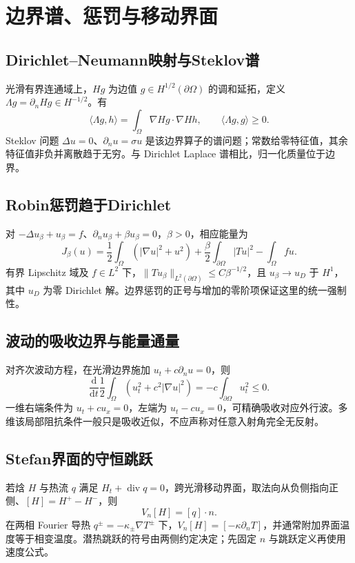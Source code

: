 \documentclass[../main.tex]{subfiles}
\begin{document}
\section{边界谱、惩罚与移动界面}
\subsection{Dirichlet--Neumann映射与Steklov谱}
光滑有界连通域上，$Hg$ 为边值 $g\in H^{1/2}(\partial\Omega)$ 的调和延拓，定义 $\Lambda g=\partial_nHg\in H^{-1/2}$。有
\[
\langle\Lambda g,h\rangle=\int_\Omega\nabla Hg\cdot\nabla Hh,\qquad
\langle\Lambda g,g\rangle\ge0.
\]
Steklov 问题 $\Delta u=0$、$\partial_nu=\sigma u$ 是该边界算子的谱问题；常数给零特征值，其余特征值非负并离散趋于无穷。与 Dirichlet Laplace 谱相比，归一化质量位于边界。
\subsection{Robin惩罚趋于Dirichlet}
对 $-\Delta u_\beta+u_\beta=f$、$\partial_nu_\beta+\beta u_\beta=0$，$\beta>0$，相应能量为
\[
J_\beta(u)=\frac12\int_\Omega(|\nabla u|^2+u^2)
+\frac\beta2\int_{\partial\Omega}|Tu|^2-\int_\Omega fu.
\]
有界 Lipschitz 域及 $f\in L^2$ 下，$\|Tu_\beta\|_{L^2(\partial\Omega)}\le C\beta^{-1/2}$，且 $u_\beta\to u_D$ 于 $H^1$，其中 $u_D$ 为零 Dirichlet 解。边界惩罚的正号与增加的零阶项保证这里的统一强制性。
\subsection{波动的吸收边界与能量通量}
对齐次波动方程，在光滑边界施加 $u_t+c\partial_nu=0$，则
\[
\frac{\mathrm d}{\mathrm dt}\frac12\int_\Omega(u_t^2+c^2|\nabla u|^2)
=-c\int_{\partial\Omega}u_t^2\le0.
\]
一维右端条件为 $u_t+cu_x=0$，左端为 $u_t-cu_x=0$，可精确吸收对应外行波。多维该局部阻抗条件一般只是吸收近似，不应声称对任意入射角完全无反射。
\subsection{Stefan界面的守恒跳跃}
若焓 $H$ 与热流 $q$ 满足 $H_t+\operatorname{div}q=0$，跨光滑移动界面，取法向从负侧指向正侧、$[H]=H^+-H^-$，则
\[
V_n[H]=[q]\cdot n.
\]
在两相 Fourier 导热 $q^\pm=-\kappa_\pm\nabla T^\pm$ 下，$V_n[H]=[-\kappa\partial_nT]$，并通常附加界面温度等于相变温度。潜热跳跃的符号由两侧约定决定；先固定 $n$ 与跳跃定义再使用速度公式。
\end{document}
